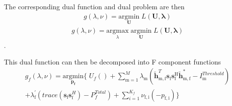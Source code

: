 \documentclass[12pt,a4paper]{report}
\begin{document}
The corresponding dual function and dual problem are then 
\begin{gather*}
g(\lambda,\nu) = \underset{\mathbf{U}}{\mathrm{argmin}}\;L(\mathbf{U,\lambda})
\end{gather*}
\begin{gather*}
g(\lambda,\nu) = \underset{\lambda}{\mathrm{argmax}}\;\underset{\mathbf{U}}{\mathrm{argmin}}\;L(\mathbf{U,\lambda})
\end{gather*}
.



This dual function can then be decomposed into F component functions
\begin{multline}
g_f(\lambda,\nu) = \underset{\mathbf{p_f}}{\mathrm{argmin}}
\{
\;
U_f() 
+
\sum_{\mathrm{m=1}}^M \lambda_{\mathrm{m}}
(\mathbf{\tilde{h}}_{\mathrm{m,f}}^T  \mathbf{s}_{\mathrm{f}} 						
	\mathbf{s_{\mathrm{f}}^{\mathrm{H}}} \mathbf{\tilde{h}_{\mathrm{m,f}}^*} - I^{Threshold}		
	_{\mathrm{m}} )
\\
+ 
\lambda_{\mathrm{f}}^{'}(trace(\mathbf{s}_\mathrm{f}\mathbf{s}_\mathrm{f}^H)-P^{Total}_{f} )
+
\sum_{i=1}^{K_f}
\nu_{\mathrm{f,i}}(-p_{\mathrm{f,i}})\}
\end{multline}
\\
\end{document}
